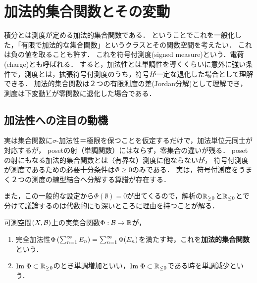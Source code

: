 \documentclass[uplatex, dvipdfmx]{jsreport}
\begin{document}
\section{加法的集合関数とその変動}

\begin{tcolorbox}[colframe=ForestGreen, colback=ForestGreen!10!white,breakable,colbacktitle=ForestGreen!40!white,coltitle=black,fonttitle=\bfseries\sffamily,
title=加法的集合関数という概念：表現可能関手！？]
    積分とは測度が定める加法的集合関数である．
    ということでこれを一般化した，「有限で加法的な集合関数」というクラスとその関数空間を考えたい．
    これは負の値を取ることも許す．
    これを符号付測度(signed measure)という．電荷(charge)とも呼ばれる．
    すると，加法性とは単調性を導くくらいに意外に強い条件で，測度とは，拡張符号付測度のうち，符号が一定な退化した場合として理解できる．
    加法的集合関数は２つの有限測度の差(Jordan分解)として理解でき，測度は下変動$\underline{V}$が零関数に退化した場合である．
\end{tcolorbox}

\subsection{加法性への注目の動機}

\begin{tcolorbox}[colframe=ForestGreen, colback=ForestGreen!10!white,breakable,colbacktitle=ForestGreen!40!white,coltitle=black,fonttitle=\bfseries\sffamily,
title=]
    実は集合関数に$\sigma$-加法性＝極限を保つことを仮定するだけで，加法単位元同士が対応するが，
    posetの射（単調関数）にはならず，零集合の違いが残る．
    posetの射にもなる加法的集合関数とは（有界な）測度に他ならないが，
    符号付測度が測度であるための必要十分条件は$\Phi\ge 0$のみである．
    実は，符号付測度をうまく２つの測度の線型結合へ分解する算譜が存在する．

    また，この一般的な設定から$\Phi(\emptyset)=0$が出てくるので，解析の$\mathbb{R}_{\ge 0}$と$\mathbb{R}_{\le 0}$とで分けて議論するのは代数的にも深いところに理由を持つことが解る．
\end{tcolorbox}

\begin{definition}
    可測空間$(X,\mathcal{B})$上の実集合関数$\Phi:\mathcal{B}\to\mathbb{R}$が，
    \begin{enumerate}
        \item 完全加法性$\Phi\left(\sum^\infty_{n=1}E_n\right)=\sum^\infty_{n=1}\Phi(E_n)$を満たす時，これを\textbf{加法的集合関数}という．
        \item $\mathrm{Im}\;\Phi\subset\mathbb{R}_{\ge 0}$のとき単調増加といい，$\mathrm{Im}\;\Phi\subset\mathbb{R}_{\le 0}$である時を単調減少という．
    \end{enumerate}
\end{definition}
\end{document}
